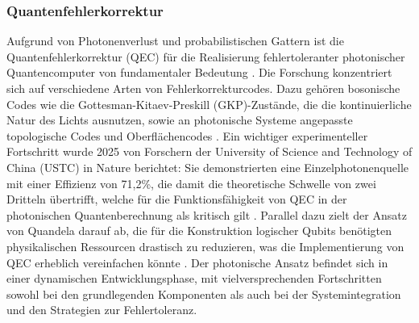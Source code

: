 \subsubsection{Quantenfehlerkorrektur}
Aufgrund von Photonenverlust und probabilistischen Gattern ist die Quantenfehlerkorrektur (QEC) für die Realisierung fehlertoleranter photonischer Quantencomputer von fundamentaler Bedeutung \cite{swayneChineseScientistsOvercome2025}. Die Forschung konzentriert sich auf verschiedene Arten von Fehlerkorrekturcodes. Dazu gehören bosonische Codes wie die Gottesman-Kitaev-Preskill (GKP)-Zustände, die die kontinuierliche Natur des Lichts ausnutzen, sowie an photonische Systeme angepasste topologische Codes und Oberflächencodes \cite{LinearOpticsScalable}. Ein wichtiger experimenteller Fortschritt wurde 2025 von Forschern der University of Science and Technology of China (USTC) in
Nature berichtet: Sie demonstrierten eine Einzelphotonenquelle mit einer Effizienz von 71,2\%, die damit die theoretische Schwelle von zwei Dritteln übertrifft, welche für die Funktionsfähigkeit von QEC in der photonischen Quantenberechnung als kritisch gilt \cite{swayneChineseScientistsOvercome2025}. Parallel dazu zielt der Ansatz von Quandela darauf ab, die für die Konstruktion logischer Qubits benötigten physikalischen Ressourcen drastisch zu reduzieren, was die Implementierung von QEC erheblich vereinfachen könnte \cite{QuandelaAnnounces100000fold2025}.
Der photonische Ansatz befindet sich in einer dynamischen Entwicklungsphase, mit vielversprechenden Fortschritten sowohl bei den grundlegenden Komponenten als auch bei der Systemintegration und den Strategien zur Fehlertoleranz.
